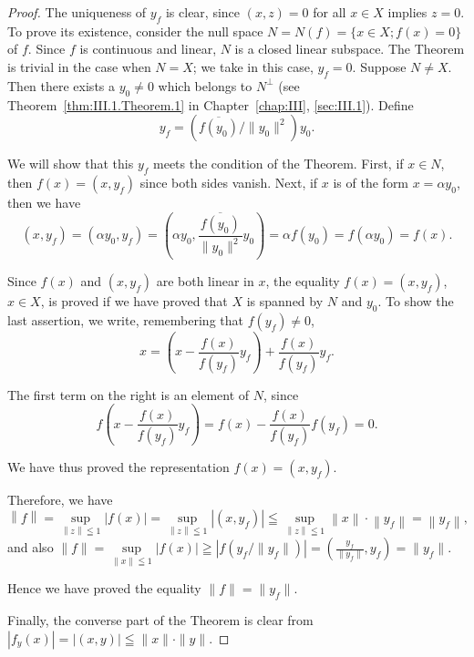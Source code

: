 \begin{proof}
 The uniqueness of $y_{f}$ is clear, since $(x,z)=0$ for all $x\in X$ implies $z=0$. To prove its existence, consider the null space $N=N(f)=\{x\in X;f(x)=0\}$ of $f$. Since $f$ is continuous and linear, $N$ is a closed linear subspace. The Theorem is trivial in the case when $N=X$; we take in this case, $y_{f}=0$. Suppose $N\neq X$. Then there exists a $y_{0}\neq0$ which belongs to $N^{\perp}$ (see Theorem~\ref{thm:III.1.Theorem.1} in Chapter~\ref{chap:III}, \ref{sec:III.1}). Define 
\begin{equation}\label{eq:III.6.3}
y _{f} = (\overline {{f (y _{0})}} / \| y _{0} \| ^{2}) y _{0}. \end{equation}

We will show that this $y_{f}$ meets the condition of the Theorem. First, if $x \in N$, then $f(x) = (x, y_{f})$ since both sides vanish. Next, if $x$ is of the form $x = \alpha y_{0}$, then we have 
\[
(x, y _{f}) = (\alpha y _{0}, y _{f}) = \left(\alpha y _{0}, \frac {\overline {{f (y _{0})}}}{\| y _{0} \| ^{2}} y _{0}\right) = \alpha f (y _{0}) = f (\alpha y _{0}) = f (x).
\]

Since $f(x)$ and $(x, y_{f})$ are both linear in $x$, the equality $f(x) = (x, y_{f})$, $x \in X$, is proved if we have proved that $X$ is spanned by $N$ and $y_{0}$. To show the last assertion, we write, remembering that $f(y_{f}) \neq 0$, 
\[
x = \left(x - \frac {f (x)}{f (y _{f})} y _{f}\right) + \frac {f (x)}{f (y _{f})} y _{f}.
\]

The first term on the right is an element of $N$, since 
\[
f \left(x - \frac {f (x)}{f \left(y _{f}\right)} y _{f}\right) = f (x) - \frac {f (x)}{f \left(y _{f}\right)} f \left(y _{f}\right) = 0.
\]

We have thus proved the representation $f(x) = (x, y_f)$. 

Therefore, we have 
\[
\left\| f \right\| = \sup\limits _{\left\| z \right\| \leqq 1} \left| f (x) \right| = \sup\limits _{\left\| z \right\| \leqq 1} \left| (x, y _{f}) \right| \leqq \sup\limits _{\left\| z \right\| \leqq 1} \left\| x \right\| \cdot \left\| y _{f} \right\| = \left\| y _{f} \right\|,
\]
and also $\|f\| = \sup\limits_{\|x\|\leqq 1}|f(x)| \geqq |f(y_f / \|y_f\|)| = \left(\frac{y_f}{\|y_f\|}, y_f\right) = \|y_f\|$. 

Hence we have proved the equality $\|f\| = \|y_f\|$. 

Finally, the converse part of the Theorem is clear from $|f_y(x)| = |(x, y)| \leqq \|x\| \cdot \|y\|$. 
\end{proof}

